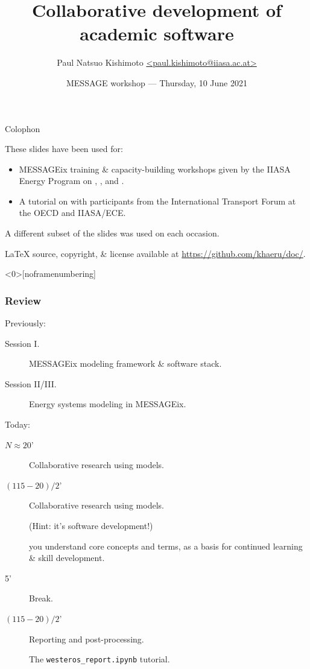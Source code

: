\documentclass[12pt,aspectratio=169]{beamer}
\title{Collaborative development of academic software}
\institute{IIASA Energy, Climate, and Environment program}
\date{MESSAGE workshop — Thursday, 10 June 2021}
\author{\texorpdfstring{Paul Natsuo Kishimoto \scriptsize\newline
  \href{mailto:paul.kishimoto@iiasa.ac.at}%
       {\ttfamily <paul.kishimoto@iiasa.ac.at>}}%
  {Paul Natsuo Kishimoto <paul.kishimoto@iiasa.ac.at>}}
\begin{document}
\maketitle

\begin{frame}{Colophon}

These slides have been used for:
\begin{itemize}
  \item MESSAGEix training \& capacity-building workshops given by the IIASA Energy Program on , , and .

  \item A tutorial on  with participants from the International Transport Forum at the OECD and IIASA/ECE.
\end{itemize}

\medskip
A different subset of the slides was used on each occasion.

\medskip
LaTeX source, copyright, \& license available at \url{https://github.com/khaeru/doc/}.

\end{frame}

\begin{frame}<0>[noframenumbering]  %
\frametitle{Review}

Previously:
\begin{description}
  \item [Session I.] MESSAGEix modeling framework \& software stack.
  \item [Session II/III.] Energy systems modeling in MESSAGEix.
\end{description}

\bigskip
Today:
\begin{description}
  \item [$N \approx 20$'] Collaborative research using models.


  \item [$(115 - 20) / 2$'] Collaborative research using models.

  (Hint: it's software development!)

   you understand core concepts and terms, as a basis for continued learning \& skill development.

  \item [5'] Break.

  \item [$(115 - 20) / 2$'] Reporting and post-processing.

  The \texttt{westeros\_report.ipynb} tutorial.
\end{description}

\end{frame}
\end{document}
